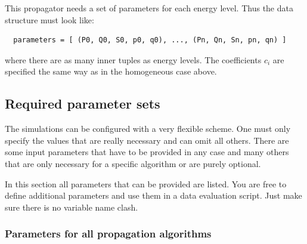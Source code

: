 \documentclass[a4paper,10pt]{report}
\begin{document}
This propagator needs a set of parameters for each energy level. Thus
the data structure must look like:

\begin{verbatim}
  parameters = [ (P0, Q0, S0, p0, q0), ..., (Pn, Qn, Sn, pn, qn) ]
\end{verbatim}

where there are as many inner tuples as energy levels. The coefficients $c_i$
are specified the same way as in the homogeneous case above.


\subsection{Required parameter sets}

The simulations can be configured with a very flexible scheme. One must only
specify the values that are really necessary and can omit all others. There
are some input parameters that have to be provided in any case and many others that
are only necessary for a specific algorithm or are purely optional.

In this section all parameters that can be provided are listed.
You are free to define additional parameters and use them in a data evaluation
script. Just make sure there is no variable name clash.


\subsubsection{Parameters for all propagation algorithms}
\end{document}
